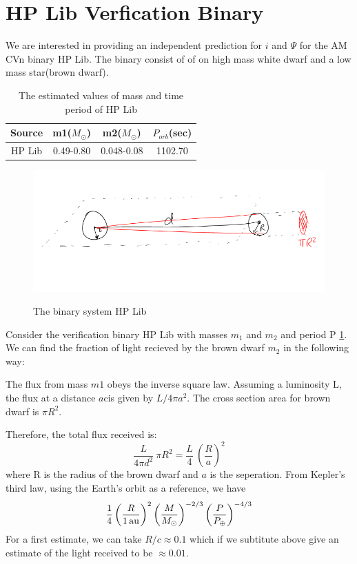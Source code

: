 \documentclass[10pt,a4paper]{article}
\begin{document}
\section*{HP Lib Verfication Binary}

We are interested in providing an independent prediction for $i$ and $\Psi$ for the AM CVn binary HP Lib. The binary consist of of on high mass white dwarf and a low mass star(brown dwarf).\\

\begin{table}[H]
\centering
\begin{tabular}{|c|c|c|c|}
\hline 
\rule[-1ex]{0pt}{2.5ex} Source & m1($M_{\odot}$) & m2($M_{\odot}$) & $P_{orb}$(sec) \\ 
\hline 
\rule[-1ex]{0pt}{2.5ex} HP Lib & 0.49-0.80 & 0.048-0.08 & 1102.70 \\ 
\hline 
\end{tabular}
\caption{The estimated values of mass and time period of HP Lib}
\end{table}

\begin{figure}[ht]
\centering
\includegraphics[scale=0.5]{diagram1.png}
\label{1}
\caption{The binary system HP Lib}
\end{figure}

Consider the verification binary HP Lib with masses $m_1$ and $m_2$ and period P \ref{1}. We can find the fraction of light recieved by the brown dwarf $m_2$ in the following way:

The flux from mass $m1$ obeys the inverse square law. Assuming a luminosity L, the flux at a distance $a$cis given by $L/4 \pi a^2$. The cross section area for brown dwarf is $\pi R^2$.


Therefore, the total flux received is:
$$\frac{L}{4 \pi d^2} \ \pi R^2 = \frac{L}{4} \ \left(\frac{R}{a}\right)^2 $$
where R is the radius of the brown dwarf and $a$ is the seperation.
From Kepler's third law, using the Earth's orbit as a reference, we have
\begin{equation}
  \frac{1}{4} \left(\frac{R}{\rm 1\,au}\right)^2
  \left(\frac{M}{M_{\odot}}\right)^{-2/3}
  \left(\frac{P}{P_{\oplus}}\right)^{-4/3}
\end{equation}
For a first estimate, we can take $R/c \approx 0.1$ which if we subtitute above give an estimate of the light received to be $\approx 0.01$.




\end{document}
